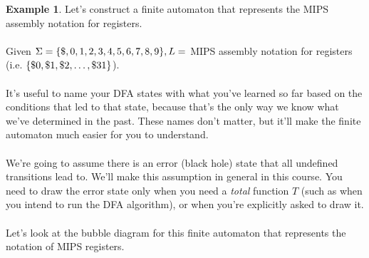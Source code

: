 \documentclass[]{article}
\DeclarePairedDelimiter{\set}{\lbrace}{\rbrace}
\theoremstyle{definition}
\newtheorem{ex}{Example}[section]
\begin{document}
			\begin{ex}
				Let's construct a finite automaton that represents the MIPS assembly notation for registers.
				\\ \\
				Given $\Sigma = \set{\$, 0, 1, 2, 3, 4, 5, 6, 7, 8, 9}, L = $ MIPS assembly notation for registers (i.e. $\set{\$0, \$1, \$2, \ldots, \$31}$).
				\\ \\
				It's useful to name your DFA states with what you've learned so far based on the conditions that led to that state, because that's the only way we know what we've determined in the past. These names don't matter, but it'll make the finite automaton much easier for you to understand.
				\\ \\
				We're going to assume there is an error (black hole) state that all undefined transitions lead to. We'll make this assumption in general in this course. You need to draw the error state only when you need a \emph{total} function $T$ (such as when you intend to run the DFA algorithm), or when you're explicitly asked to draw it.
				\\ \\
				Let's look at the bubble diagram for this finite automaton that represents the notation of MIPS registers.
				\begin{center}
\end{center}
\end{ex}
\end{document}
